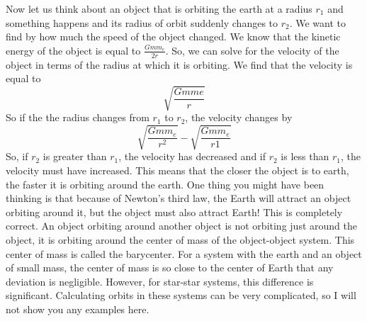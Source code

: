 Now let us think about an object that is orbiting the earth at a radius $r_1$ and something happens and its radius of orbit suddenly changes to $r_2$. We want to find by how much the speed of the object changed. We know that the kinetic energy of the object is equal to $\frac{G m m_e}{2r}$. So, we can solve for the velocity of the object in terms of the radius at which it is orbiting. We find that the velocity is equal to $$\sqrt{\frac{Gmme}{r}}$$ So if the the radius changes from $r_1$ to $r_2$, the velocity changes by $$\sqrt{\frac{G m m_e}{r^2}}-\sqrt{\frac{G m m_e}{r1}}$$ So, if $r_2$ is greater than $r_1$, the velocity has decreased and if $r_2$ is less than $r_1$, the velocity must have increased. This means that the closer the object is to earth, the faster it is orbiting around the earth.
One thing you might have been thinking is that because of Newton’s third law, the Earth will attract an object orbiting around it, but the object must also attract Earth! This is completely correct. An object orbiting around another object is not orbiting just around the object, it is orbiting around the center of mass of the object-object system. This center of mass is called the barycenter. For a system with the earth and an object of small mass, the center of mass is so close to the center of Earth that any deviation is negligible. However, for star-star systems, this difference is significant. Calculating orbits in these systems can be very complicated, so I will not show you any examples here.